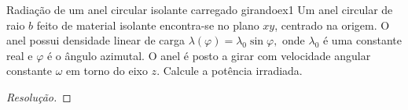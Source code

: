 \begin{exercício}{Radiação de um anel circular isolante carregado girando}{ex1}
    Um anel circular de raio \(b\) feito de material isolante encontra-se no plano \(xy\), centrado na origem. O anel possui densidade linear de carga \(\lambda(\varphi) = \lambda_0 \sin \varphi,\) onde \(\lambda_0\) é uma constante real e \(\varphi\) é o ângulo azimutal. O anel é posto a girar com velocidade angular constante \(\omega\) em torno do eixo \(z.\) Calcule a potência irradiada.
\end{exercício}
\begin{proof}[Resolução]
    
\end{proof}
